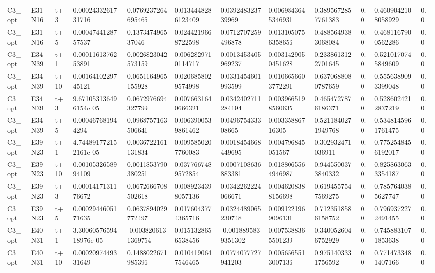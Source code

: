 \begin{landscape}
\begin{longtable}{llllllllllll}
C3\_opt & E31N16 & t+3 & 0.0002433261731716 & 0.0769237264695465 & 0.0134448286123409 & 0.039248323739969 & 0.0069843645346931 & 0.3895672857761383 & 0.0 & 0.4609042108058929 & 0.0 \\
C3\_opt & E31N16 & t+5 & 0.0004744128757537 & 0.137347496537046 & 0.0244219668722598 & 0.0712707259496878 & 0.0131050756358656 & 0.4885649383068084 & 0.0 & 0.4681167900562286 & 0.0 \\
C3\_opt & E34N39 & t+1 & 0.0001161376253891 & 0.0026823042573159 & 0.0062829710114717 & 0.0013453405969237 & 0.0031429050451628 & 0.2338613122701645 & 0.0 & 0.5210170745849609 & 0.0 \\
C3\_opt & E34N39 & t+10 & 0.0016410229745121 & 0.0651164965155928 & 0.0206858029574998 & 0.0331454601993599 & 0.0106656603772291 & 0.6370688080787659 & 0.0 & 0.5556389093399048 & 0.0 \\
C3\_opt & E34N39 & t+3 & 9.671053136496154e-05 & 0.0672976694327799 & 0.0076631640666321 & 0.0342402711284194 & 0.0039665198560635 & 0.4654727876186371 & 0.0 & 0.5286024212837219 & 0.0 \\
C3\_opt & E34N39 & t+5 & 0.000467681944294 & 0.0968757163506641 & 0.0063900539861462 & 0.049675433308665 & 0.00335886716305 & 0.5211840271949768 & 0.0 & 0.5348145961761475 & 0.0 \\
C3\_opt & E39N23 & t+1 & 4.744891772152161e-05 & 0.0036722161131834 & 0.0095850207760083 & 0.0018454668449695 & 0.004796845051567 & 0.302932471036911 & 0.0 & 0.7752548456192017 & 0.0 \\
C3\_opt & E39N23 & t+10 & 0.0010532658994109 & 0.0011853790380251 & 0.0377667489572854 & 0.0007108636883381 & 0.0188065564946987 & 0.9445500373840332 & 0.0 & 0.8258630633354187 & 0.0 \\
C3\_opt & E39N23 & t+3 & 0.0001417131176672 & 0.0672666708502618 & 0.0089234398057136 & 0.0342262224066671 & 0.0046208388156698 & 0.6194557547569275 & 0.0 & 0.7857640385627747 & 0.0 \\
C3\_opt & E39N23 & t+5 & 0.0002944605171635 & 0.0637894029772497 & 0.0176043774365716 & 0.0324489065230748 & 0.0091221969096131 & 0.7123518586158752 & 0.0 & 0.7969372272491455 & 0.0 \\
C3\_opt & E40N31 & t+1 & 3.3006057659418976e-05 & -0.0038206131369754 & 0.0151328656538456 & -0.0018895839351302 & 0.0075388365501239 & 0.3400526046752929 & 0.0 & 0.7458831071853638 & 0.0 \\
C3\_opt & E40N31 & t+10 & 0.0002097449331649 & 0.1488022671985396 & 0.0104190647546465 & 0.0774077727941203 & 0.0056565513007136 & 0.9751403331756592 & 0.0 & 0.7714733481407166 & 0.0 \\

\end{longtable}
\end{landscape}
